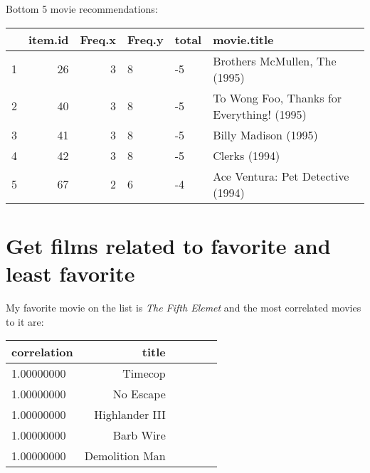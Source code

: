 \documentclass[12pt, a4paper]{article}
\begin{document}
Bottom 5 movie recommendations:

\begin{minipage}{\linewidth} %
\vspace{2em}
\centering
\begin{tabular}{|l|r|r|l|l|l|}
    \hline
      & item.id & Freq.x & Freq.y & total & movie.title\\
    \hline
    1 & 26 & 3 & 8 & -5 & Brothers McMullen, The (1995)\\
    \hline
    2 & 40 & 3 & 8 & -5 & To Wong Foo, Thanks for Everything! (1995)\\
    \hline
    3 & 41 & 3 & 8 & -5 & Billy Madison (1995)\\
    \hline
    4 & 42 & 3 & 8 & -5 & Clerks (1994)\\
    \hline
    5 & 67 & 2 & 6 & -4 & Ace Ventura: Pet Detective (1994)\\
    \hline
\end{tabular}
\vspace{2em}
\end{minipage}



\newpage
\section{Get films related to favorite and least favorite}

My favorite movie on the list is \emph{The Fifth Elemet} and the most correlated movies to it are:

\begin{minipage}{\linewidth} %
\vspace{2em}
\centering
\begin{tabular}{|l|r|r|l|l|l|}
        \hline
        correlation & title\\
        \hline
        1.00000000 & Timecop\\
        \hline
        1.00000000 & No Escape\\
        \hline
        1.00000000 & Highlander III\\
        \hline
        1.00000000 & Barb Wire\\
        \hline
        1.00000000 & Demolition Man\\
        \hline
\end{tabular}
\vspace{2em}
\end{minipage}
\end{document}
